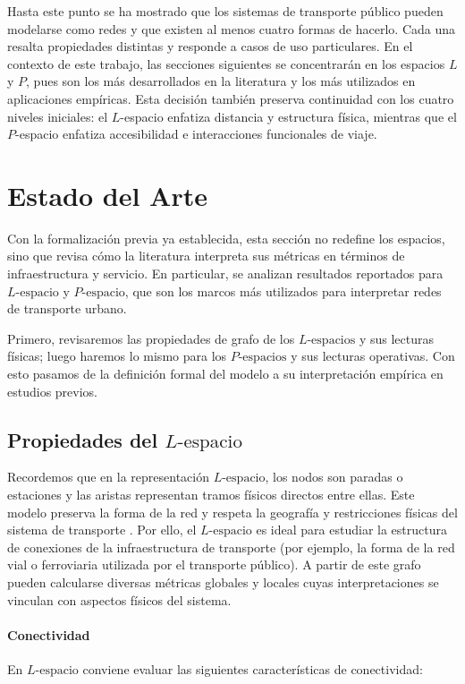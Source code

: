         Hasta este punto se ha mostrado que los sistemas de transporte público pueden modelarse como redes y que existen al menos cuatro formas de hacerlo. Cada una resalta propiedades distintas y responde a casos de uso particulares. En el contexto de este trabajo, las secciones siguientes se concentrarán en los espacios $L$ y $P$, pues son los más desarrollados en la literatura y los más utilizados en aplicaciones empíricas. Esta decisión también preserva continuidad con los cuatro niveles iniciales: el $L$-espacio enfatiza distancia y estructura física, mientras que el $P$-espacio enfatiza accesibilidad e interacciones funcionales de viaje.

    \section{Estado del Arte}
        Con la formalización previa ya establecida, esta sección no redefine los espacios, sino que revisa cómo la literatura interpreta sus métricas en términos de infraestructura y servicio. En particular, se analizan resultados reportados para $L\text{-espacio}$ y $P\text{-espacio}$, que son los marcos más utilizados para interpretar redes de transporte urbano.

        Primero, revisaremos las propiedades de grafo de los $L\text{-espacios}$ y sus lecturas físicas; luego haremos lo mismo para los $P\text{-espacios}$ y sus lecturas operativas. Con esto pasamos de la definición formal del modelo a su interpretación empírica en estudios previos.

        \subsection{Propiedades del $L\text{-espacio}$}
            Recordemos que en la representación $L\text{-espacio}$, los nodos son paradas o estaciones y las aristas representan tramos físicos directos entre ellas. Este modelo preserva la forma de la red y respeta la geografía y restricciones físicas del sistema de transporte \cite{dingluo2019}. Por ello, el $L\text{-espacio}$ es ideal para estudiar la estructura de conexiones de la infraestructura de transporte (por ejemplo, la forma de la red vial o ferroviaria utilizada por el transporte público). A partir de este grafo pueden calcularse diversas métricas globales y locales cuyas interpretaciones se vinculan con aspectos físicos del sistema.

            \paragraph{Conectividad}
            En $L\text{-espacio}$ conviene evaluar las siguientes características de conectividad:

